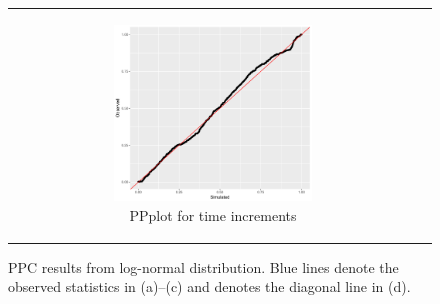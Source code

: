 \documentclass[ba]{imsart}
\numberwithin{equation}{section}
\theoremstyle{plain}
\begin{document}
\begin{figure}[!htb]
\begin{tabular}[t]{cc}
\begin{subfigure}[b]{0.495\textwidth}
			   	\end{subfigure}
			   	\begin{subfigure}[b]{0.495\textwidth}
			   				\centering
			   		\caption{PPplot for time increments}
			   		\includegraphics[width=0.625\textwidth]{img/timeppnew.pdf}	
			   	\end{subfigure}
		\end{tabular}
		\caption {PPC results from log-normal distribution. Blue lines denote the observed statistics in (a)--(c) and denotes the diagonal line in (d).}
		\label{figure:PPCresults}
	\end{figure}
	
\end{document}
